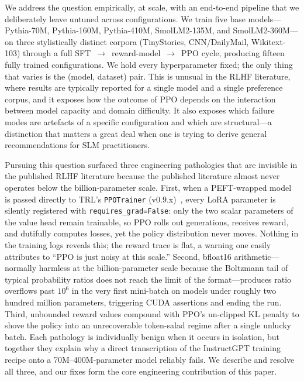 \documentclass[10pt,twocolumn,letterpaper]{article}
\begin{document}
We address the question empirically, at scale, with an end-to-end pipeline that we deliberately leave untuned across configurations. We train five base models---Pythia-70M, Pythia-160M, Pythia-410M, SmolLM2-135M, and SmolLM2-360M---on three stylistically distinct corpora (TinyStories, CNN/DailyMail, Wikitext-103) through a full SFT~$\to$~reward-model~$\to$~PPO cycle, producing fifteen fully trained configurations. We hold every hyperparameter fixed; the only thing that varies is the (model, dataset) pair. This is unusual in the RLHF literature, where results are typically reported for a single model and a single preference corpus, and it exposes how the outcome of PPO depends on the interaction between model capacity and domain difficulty. It also exposes which failure modes are artefacts of a specific configuration and which are structural---a distinction that matters a great deal when one is trying to derive general recommendations for SLM practitioners.

Pursuing this question surfaced three engineering pathologies that are invisible in the published RLHF literature because the published literature almost never operates below the billion-parameter scale. First, when a PEFT-wrapped model is passed directly to TRL's \texttt{PPOTrainer} (v0.9.x)~\cite{vonwerra2022trl}, every LoRA parameter is silently registered with \texttt{requires\_grad=False}: only the two scalar parameters of the value head remain trainable, so PPO rolls out generations, receives reward, and dutifully computes losses, yet the policy distribution never moves. Nothing in the training logs reveals this; the reward trace is flat, a warning one easily attributes to ``PPO is just noisy at this scale.'' Second, bfloat16 arithmetic---normally harmless at the billion-parameter scale because the Boltzmann tail of typical probability ratios does not reach the limit of the format---produces ratio overflows past $10^6$ in the very first mini-batch on models under roughly two hundred million parameters, triggering CUDA assertions and ending the run. Third, unbounded reward values compound with PPO's un-clipped KL penalty to shove the policy into an unrecoverable token-salad regime after a single unlucky batch. Each pathology is individually benign when it occurs in isolation, but together they explain why a direct transcription of the InstructGPT training recipe onto a 70M--400M-parameter model reliably fails. We describe and resolve all three, and our fixes form the core engineering contribution of this paper.
\end{document}
